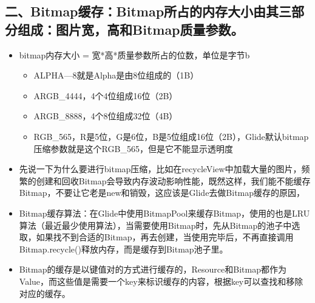 \documentclass[9pt, b5paper]{article}
\begin{document}
\subsection{二、Bitmap缓存：Bitmap所占的内存大小由其三部分组成：图片宽，高和Bitmap质量参数。}
\label{sec-4-2}
\begin{itemize}
\item bitmap内存大小 = 宽*高*质量参数所占的位数，单位是字节b
\begin{itemize}
\item ALPHA—8就是Alpha是由8位组成的（1B）
\item ARGB\_4444，4个4位组成16位（2B）
\item ARGB\_8888，4个8位组成32位（4B）
\item RGB\_565，R是5位，G是6位，B是5位组成16位（2B），Glide默认bitmap压缩参数就是这个RGB\_565，但是它不能显示透明度
\end{itemize}
\item 先说一下为什么要进行bitmap压缩，比如在recycleView中加载大量的图片，频繁的创建和回收Bitmap会导致内存波动影响性能，既然这样，我们能不能缓存Bitmap，不要让它老是new和销毁，这应该是Glide去做Bitmap缓存的原因，
\item Bitmap缓存算法：在Glide中使用BitmapPool来缓存Bitmap，使用的也是LRU算法（最近最少使用算法），当需要使用Bitmap时，先从Bitmap的池子中选取，如果找不到合适的Bitmap，再去创建，当使用完毕后，不再直接调用Bitmap.recycle()释放内存，而是缓存到Bitmap池子里。
\item Bitmap的缓存是以键值对的方式进行缓存的，Resource和Bitmap都作为Value，而这些值是需要一个key来标识缓存的内容，根据key可以查找和移除对应的缓存。
\end{itemize}
\end{document}
